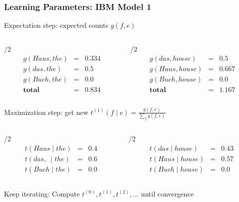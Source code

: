 \begin{frame}
\frametitle{Learning Parameters: IBM Model 1}

\begin{block}{Expectation step: expected counts $g(f,e)$}

\begin{columns}

\begin{column}{\textwidth/2}
\[
\begin{array}{lcl}
g(Haus, the) & = & 0.334 \\
g(das, the) & = & 0.5 \\
g(Buch, the) & = & 0.0 \\
\textbf{total} & = & 0.834
\end{array}
\]

\end{column}

\begin{column}{\textwidth/2}
\[
\begin{array}{lcl}
g(das, house) & = & 0.5 \\
g(Haus, house) & = & 0.667 \\
g(Buch, house) & = & 0.0 \\
\textbf{total} & = & 1.167
 \end{array}
\]

\end{column}

\end{columns}

\end{block}\pause

\begin{block}{Maximization step: get new $t^{(1)}(f \mid e) = \frac{ g(f,e) }{ \sum_f g(f,e) } $}

\begin{columns}

\begin{column}{\textwidth/2}
\[
\begin{array}{lcl}
t(Haus \mid the) & = & 0.4 \\
t(das,\ \mid the) & = & 0.6 \\
t(Buch \mid the) & = & 0.0 
\end{array}
\]

\end{column}

\begin{column}{\textwidth/2}
\[
\begin{array}{lcl}
t(das \mid house) & = & 0.43 \\
t(Haus \mid house) & = & 0.57 \\
t(Buch \mid house) & = & 0.0 
\end{array}
\]

\end{column}

\end{columns}

Keep iterating: Compute $t^{(0)}, t^{(1)}, t^{(2)}, \ldots$ until convergence
\end{block}

\end{frame}


